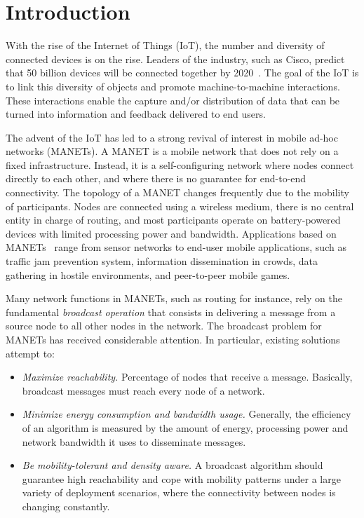 
\section{Introduction}

With the rise of the Internet of Things (IoT), the number and diversity of connected devices is on the rise.
%
%
Leaders of the industry, such as Cisco, predict that 50 billion devices will be connected together by 2020~\cite{DaveEvans-IoT}.
%
The goal of the IoT is to link this diversity of objects and promote machine-to-machine interactions.
%
These interactions enable the capture and/or distribution of data that can be turned into information and feedback delivered to end users.


The advent of the IoT has led to a strong revival of interest in mobile ad-hoc networks (MANETs).
%
A MANET is a mobile network that does not rely on a fixed infrastructure.
Instead, it is a self-configuring network where nodes connect directly to each other, and where there is no guarantee for end-to-end connectivity.
%
The topology of a MANET changes frequently due to the mobility of participants.
%
Nodes are connected using a wireless medium, there is no central entity in charge of routing, and most participants operate on battery-powered devices with limited processing power and bandwidth.
%
Applications based on MANETs~\cite{overview_adhoc_networks} range from sensor networks to end-user mobile applications, such as traffic jam prevention system, information dissemination in crowds, data gathering in hostile environments, and peer-to-peer mobile games.


Many network functions in MANETs, such as routing for instance, rely on the fundamental \textit{broadcast operation} that consists in delivering a message from a source node to all other nodes in the network.
%
The broadcast problem for MANETs has received considerable attention.
%
In particular, existing solutions attempt to:

\vspace{-1mm}
\begin{itemize}
	\item \textit{Maximize reachability.} Percentage of nodes that receive a message. Basically, broadcast messages must reach every node of a network.
	
	\item \textit{Minimize energy consumption and bandwidth usage.} Generally, the efficiency of an algorithm is measured by the amount of energy, processing power and network bandwidth it uses to disseminate messages.
	
	\item \textit{Be mobility-tolerant and density aware.} A broadcast algorithm should guarantee high reachability and cope with mobility patterns under a large variety of deployment scenarios, where the connectivity between nodes is changing constantly.
	
\end{itemize}


